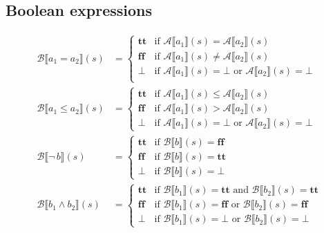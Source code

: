 \documentclass[11pt,oneside,a4paper]{article}
\newcommand{\SExp}[2]{\mathcal{#1}\llbracket #2 \rrbracket}
\newcommand{\AExp}[2]{\SExp{A}{#1}(#2)}
\newcommand{\BExp}[2]{\SExp{B}{#1}(#2)}
\begin{document}
\subsection*{Boolean expressions}
\begin{align*} 
\BExp{a_1 = a_ 2}{s} &=
    \begin{cases}
        \textbf{tt} & \text{if } \AExp{a_1}{s} = \AExp{a_2}{s} \\
        \textbf{ff} & \text{if } \AExp{a_1}{s} \neq \AExp{a_2}{s} \\
        \bot & \text{if } \AExp{a_1}{s} = \bot \text{ or } 
                          \AExp{a_2}{s} = \bot \\
    \end{cases} \\
\mathcal{B}\llbracket a_1 \leq a_2 \rrbracket(s) &= 
    \begin{cases}
        \textbf{tt} & \text{if } \mathcal{A}\llbracket a_1 \rrbracket(s) \leq
        \mathcal{A}\llbracket a_2 \rrbracket(s) \\
        \textbf{ff} & \text{if } \mathcal{A}\llbracket a_1 \rrbracket(s) >
        \mathcal{A}\llbracket a_2 \rrbracket(s)  \\
        \bot & \text{if } \mathcal{A}\llbracket a_1 \rrbracket(s) = \bot 
                          \text{ or }
                          \mathcal{A} \llbracket a_2 \rrbracket (s) = \bot
    \end{cases} \\
\mathcal{B}\llbracket \neg\, b \rrbracket(s) &= 
    \begin{cases}
        \textbf{tt} & \text{if } \mathcal{B}\llbracket b \rrbracket(s) =
        \textbf{ff} \\
        \textbf{ff} & \text{if } \mathcal{B}\llbracket b \rrbracket(s) =
        \textbf{tt} \\
        \bot & \text{if }\mathcal{B}\llbracket b \rrbracket(s) = \bot
    \end{cases} \\
\mathcal{B}\llbracket b_1 \land b_2 \rrbracket(s) &= 
    \begin{cases}
        \textbf{tt} & \text{if } \mathcal{B}\llbracket b_1 \rrbracket(s) =
        \textbf{tt} \text{ and } \mathcal{B}\llbracket b_2 \rrbracket(s) =
        \textbf{tt} \\
        \textbf{ff} & \text{if } \mathcal{B}\llbracket b_1 \rrbracket(s) =
        \textbf{ff} \text{ or } \mathcal{B}\llbracket b_2 \rrbracket(s) =
        \textbf{ff} \\
        \bot & \text{if }\mathcal{B}\llbracket b_1 \rrbracket(s) = \bot
                         \text{ or }
                         \mathcal{B}\llbracket b_2 \rrbracket(s) = \bot
    \end{cases}
\end{align*}
\end{document}
